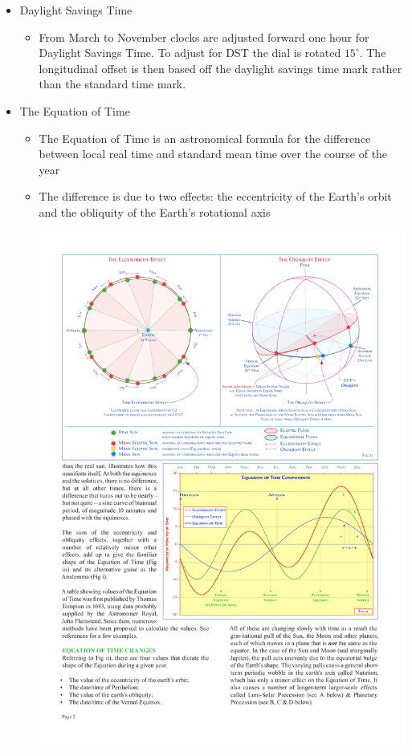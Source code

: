 \documentclass[final]{beamer}
\begin{document}
\begin{frame}
\begin{columns}[t]
\begin{column}[t]{0.24 \textwidth}
\begin{itemize}
\begin{center}
\end{center}
\item Daylight Savings Time
\begin{itemize}
\item From March to November clocks are adjusted forward one hour for
  Daylight Savings Time. To adjust for DST the dial is rotated
  $15^\circ$. The longitudinal offset is then based off the daylight
  savings time mark rather than the standard time mark.
\end{itemize}
\item The Equation of Time
\begin{itemize}
\item The Equation of Time is an astronomical formula for the difference
between local real time and standard mean time over the course of the 
year
\item The difference is due to two effects: the eccentricity of the 
Earth's orbit and the obliquity of the Earth's rotational axis
\begin{center}
\includegraphics{meansun.pdf}

\end{center}
\end{itemize}
\end{itemize}
\end{column}
\end{columns}
\end{frame}
\end{document}
